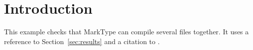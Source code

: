 \section{Introduction}
\label{sec:introduction}

This example checks that MarkType can compile several files together. It uses a
reference to Section~\ref{sec:results} and a citation to \cite{lamport1994}.
